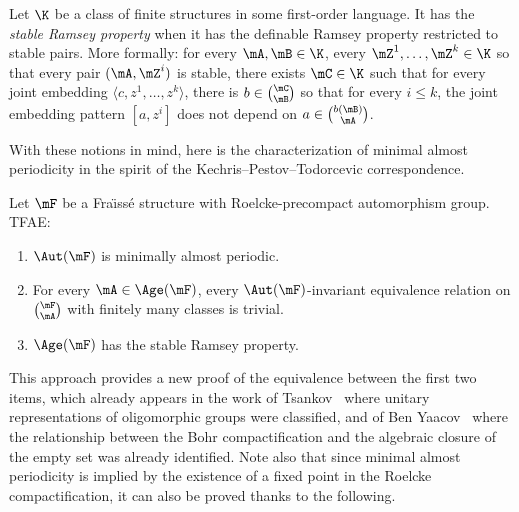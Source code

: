 \begin{defi}
Let $\K$ be a class of finite structures in some first-order language. It has the \emph{stable Ramsey property} when it has the definable Ramsey property restricted to stable pairs. More formally: for every $\mA, \mB\in \K$, every $\mZ^{1},\ldots,\mZ^{k}\in \K$ so that every pair $(\mA, \mZ^{i})$ is stable, there exists $\mC \in \K$ such that for every joint embedding $\langle c,z^{1},\ldots,z^{k}\rangle$, there is $b\in \binom{\mC}{\mB}$ so that for every $i\leq k$, the joint embedding pattern $[a,z^{i}]$ does not depend on $a\in \binom{b(\mB)}{\mA}$.
\end{defi}

With these notions in mind, here is the characterization of minimal almost periodicity in the spirit of the Kechris--Pestov--Todorcevic correspondence.

\begin{theo}\label{thm:MAPStableRP}
Let $\mF$ be a Fra\"{\i}ss\'e structure with Roelcke-precompact automorphism group. TFAE:
\begin{enumerate}
\item \label{1.6.1} $\Aut(\mF)$ is minimally almost periodic.
\item \label{1.6.2} For every $\mA\in \Age(\mF)$, every $\Aut(\mF)$-invariant equivalence relation on $\binom{\mF}{\mA}$ with finitely many classes is trivial.
\item \label{1.6.3} $\Age(\mF)$ has the stable Ramsey property.
\end{enumerate}
\end{theo}

This approach provides a new proof of the equivalence between the first two items, which already appears in the work of Tsankov~\cite{Ts} where unitary representations of oligomorphic groups were classified, and of Ben Yaacov~\cite{BY} where the relationship between the Bohr compactification and the algebraic closure of the empty set was already identified. Note also that since minimal almost periodicity is implied by the existence of a fixed point in the Roelcke compactification, it can also be proved thanks to the following.

